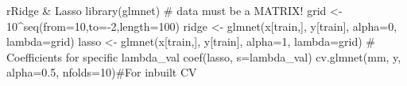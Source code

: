 \begin{codebox}{r}{Ridge \& Lasso}
library(glmnet) # data must be a MATRIX!
grid <- 10^seq(from=10,to=-2,length=100)
ridge <- glmnet(x[train,], y[train], alpha=0, lambda=grid)
lasso <- glmnet(x[train,], y[train], alpha=1, lambda=grid)
# Coefficients for specific lambda_val
coef(lasso, s=lambda_val)
cv.glmnet(mm, y, alpha=0.5, nfolds=10)#For inbuilt CV
\end{codebox}